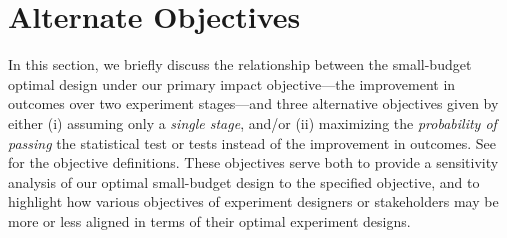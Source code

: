 \section{Alternate Objectives}
\label{sec:alternate-objectives-appendix}

In this section, we briefly discuss the relationship between the small-budget optimal design under our primary impact objective---the improvement in outcomes over two experiment stages---and three alternative objectives given by either (i) assuming only a \emph{single stage}, and/or (ii) maximizing the \emph{probability of passing} the statistical test or tests instead of the improvement in outcomes.
See  for the objective definitions.
These objectives serve both to provide a sensitivity analysis of our optimal small-budget design to the specified objective, and to highlight how various objectives of experiment designers or stakeholders may be more or less aligned in terms of their optimal experiment designs.

